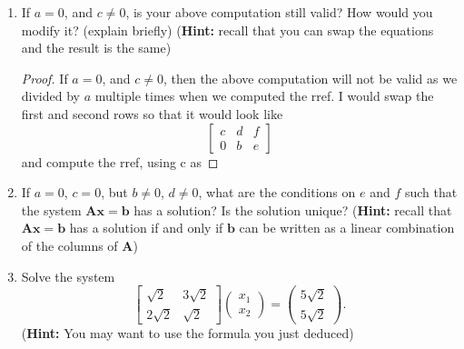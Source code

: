 \documentclass[11pt]{scrartcl}
\begin{document}
\begin{enumerate}[label=\alph*.]
{\begin{proof}
			\[x = 
			\begin{bmatrix}
			\frac{de-bf}{ad-cb}\\
			\frac{af-ce}{ad-cb}
			\end{bmatrix} \quad \text{ where } ad-cb \neq 0
			\]
			
	      \end{proof}
	      }
	\item{
	      If $a = 0$, and $c\neq 0$, is your above computation still valid?
	      How would you modify it? (explain briefly)
	      (\textbf{Hint:} recall that you can swap the equations and the result is the same)
	      \begin{proof}
		      If $a = 0$, and $c\neq 0$, then the above computation will not be valid as we
		      divided by $a$ multiple times when we computed the rref. I would swap the first
		      and second rows so that it would look like
		      \[
			      \left[\begin{array}{cc|c}
					      c & d & f \\
					      0 & b & e
				      \end{array}\right]
		      \]
		      and compute the rref, using c as
	      \end{proof}
	      }
	\item{
	      If $a = 0$, $c=0$, but $b \neq 0$, $d \neq 0$,
	      what are the conditions on $e$ and $f$ such that the system $\mathbf{Ax=b}$ has a solution?
	      Is the solution unique?  (\textbf{Hint:} recall that $\mathbf{Ax = b}$ has a solution if and only if
	      $\mathbf{b}$ can be written as a linear combination of the columns of $\mathbf{A}$)
	      }
	\item{
	      Solve the system
	      \begin{equation}
		      \left [ \begin{array}{cc}
				      \sqrt{2}  & 3\sqrt{2} \\
				      2\sqrt{2} & \sqrt{2}
			      \end{array} \right ] \left ( \begin{array}{c}
				      x_1 \\
				      x_2
			      \end{array} \right ) = \left ( \begin{array}{c}
				      5\sqrt{2} \\
				      5\sqrt{2}
			      \end{array} \right ).
	      \end{equation}
	      (\textbf{Hint:} You may want to use the formula you just deduced)
}
\end{enumerate}
\end{document}
